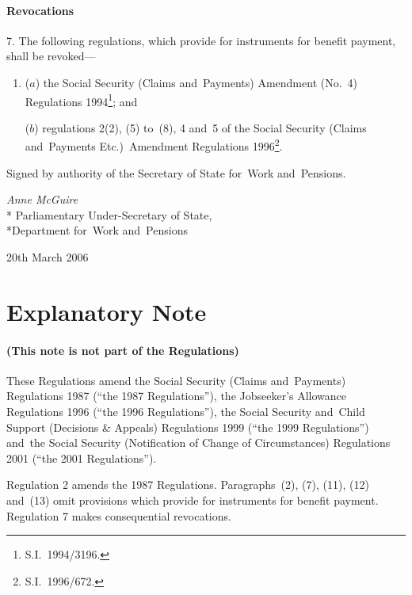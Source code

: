 \documentclass[12pt,a4paper]{article}
\begin{document}
\subsection[7. Revocations]{Revocations}

7.  The following regulations, which provide for instruments for benefit payment, shall be revoked—
\begin{enumerate}\item[]
($a$) the Social Security (Claims and~Payments) Amendment (No.~4) Regulations 1994\footnote{S.I.~1994/3196.}; and

($b$) regulations 2(2), (5) to~(8), 4 and~5 of the Social Security (Claims and~Payments Etc.)\ Amendment Regulations 1996\footnote{S.I.~1996/672.}.
\end{enumerate}

\bigskip

Signed 
by authority of the 
Secretary of State for~Work and~Pensions.

{\raggedleft
\emph{Anne McGuire}\\*
Parliamentary Under-Secretary 
of State,\\*Department 
for~Work and~Pensions

}

20th March 2006

\small

\part{Explanatory Note}

\renewcommand\parthead{— Explanatory Note}

\subsection*{(This note is not part of the Regulations)}

These Regulations amend the Social Security (Claims and~Payments) Regulations 1987 (“the 1987 Regulations”), the Jobseeker’s Allowance Regulations 1996 (“the 1996 Regulations”), the Social Security and~Child Support (Decisions \& Appeals) Regulations 1999 (“the 1999 Regulations”) and~the Social Security (Notification of Change of Circumstances) Regulations 2001 (“the 2001 Regulations”).

Regulation 2 amends the 1987 Regulations. Paragraphs~(2), (7), (11), (12) and~(13) omit provisions which provide for instruments for benefit payment. Regulation 7 makes consequential revocations.
\end{document}
